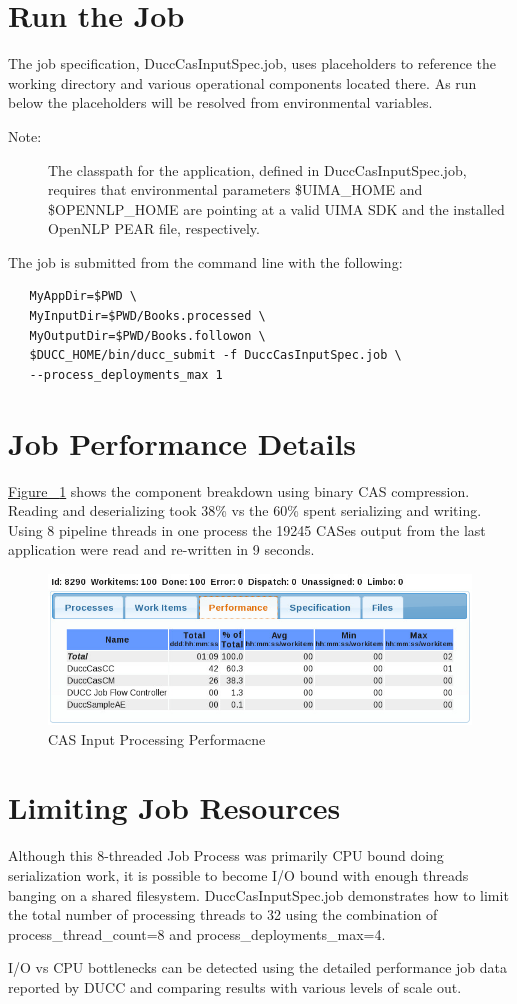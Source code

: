 \section{Run the Job}
The job specification, DuccCasInputSpec.job, uses placeholders to reference the working directory
and various operational components located there. As run below the placeholders will be resolved
from environmental variables. 

	\begin{description}
    \item[Note:] The classpath for the application, defined in DuccCasInputSpec.job, requires that environmental parameters 
    \$UIMA\_HOME and \$OPENNLP\_HOME are pointing at a valid UIMA SDK and the installed OpenNLP PEAR file, respectively. 
	\end{description}

The job is submitted from the command line with the following:
\begin{verbatim}
   MyAppDir=$PWD \
   MyInputDir=$PWD/Books.processed \ 
   MyOutputDir=$PWD/Books.followon \
   $DUCC_HOME/bin/ducc_submit -f DuccCasInputSpec.job \
   --process_deployments_max 1
\end{verbatim}

\section{Job Performance Details}
\hyperref[fig:CAS-Input-Processing]{Figure ~\ref{fig:CAS-Input-Processing}} shows the component breakdown
using binary CAS compression. Reading and deserializing took 38\% vs the 60\% spent serializing and writing.
Using 8 pipeline threads in one process the 19245 CASes output from the last application were read and 
re-written in 9 seconds.

\begin{figure}[H]
  \centering
  \includegraphics[width=5.5in]{images/BooksCasPerf.png}
  \caption{CAS Input Processing Performacne}
  \label{fig:CAS-Input-Processing}
\end{figure}

\section{Limiting Job Resources}
Although this 8-threaded Job Process was primarily CPU bound doing serialization work, it is possible to become I/O bound 
with enough threads banging on a shared filesystem.
DuccCasInputSpec.job demonstrates how to limit the total number of processing threads to 32 using the combination 
of process\_thread\_count=8 and process\_deployments\_max=4.

I/O vs CPU bottlenecks can be detected using the detailed performance job data reported by DUCC and comparing results
with various levels of scale out.
